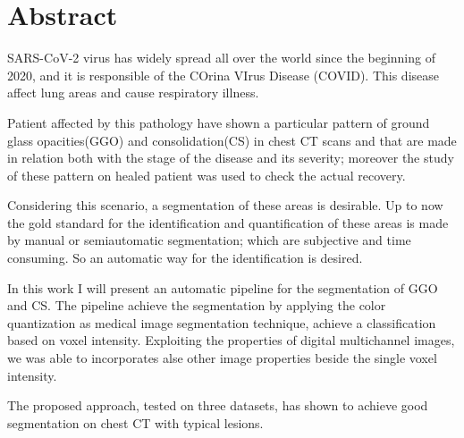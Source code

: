 \documentclass{standalone}
\begin{document}
	\chapter*{Abstract}

	SARS-CoV-2 virus has widely spread all over the world since the beginning of 2020, and it is responsible of the COrina VIrus Disease (COVID). This disease affect lung areas and cause respiratory illness. 
		
	Patient affected by this pathology have shown a particular pattern of ground glass opacities(GGO) and consolidation(CS) in chest CT scans and that are  made in relation both with the stage of the disease and its severity; moreover the study of these pattern on healed patient was used to check the actual recovery.
	
	Considering this scenario, a segmentation of these areas is desirable. Up to now the gold standard for the identification and quantification of these areas is made by manual or semiautomatic segmentation; which are subjective and time consuming. So an automatic way for the identification is desired. 
	
	In this work I will present an automatic pipeline for the segmentation of GGO and CS. The pipeline achieve the segmentation by applying the color quantization as medical image segmentation technique, achieve a classification based on voxel intensity. Exploiting the properties of digital multichannel images, we was able to incorporates alse other image properties beside the single voxel intensity. 
	
	The proposed approach, tested on three datasets, has shown to achieve good segmentation on chest CT with typical lesions. 
\end{document}

